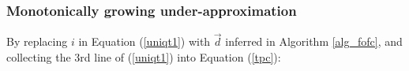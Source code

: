 \documentclass[conference]{IEEEtran}
\begin{document}

\subsubsection{Monotonically growing under-approximation}\label{subsub_nonloop}
By replacing $i$ in Equation (\ref{uniqt1}) with $\vec{d}$ inferred in Algorithm \ref{alg_fofc},
and collecting the 3rd line of (\ref{uniqt1}) into Equation (\ref{tpc}):

\end{document}
